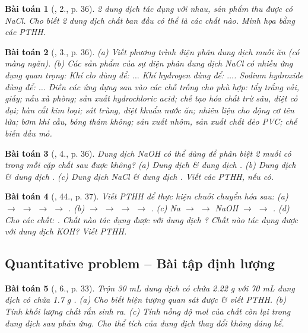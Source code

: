 \documentclass{article}
\newtheorem{baitoan}{Bài toán}
\begin{document}
\begin{baitoan}[\cite{SGK_Hoa_Hoc_9}, 2., p. 36]
	2 dung dịch tác dụng với nhau, sản phẩm thu được có \emph{NaCl}. Cho biết 2 dung dịch chất ban đầu có thể là các chất nào. Minh họa bằng các PTHH.
\end{baitoan}

\begin{baitoan}[\cite{SGK_Hoa_Hoc_9}, 3., p. 36]
	(a) Viết phương trình điện phân dung dịch muối ăn (có màng ngăn). (b) Các sản phẩm của sự điện phân dung dịch \emph{NaCl} có nhiều ứng dụng quan trọng: Khí clo dùng để: $\ldots$ Khí hydrogen dùng để: $\ldots$. Sodium hydroxide dùng để: $\ldots$ Điền các ứng dựng sau vào các chỗ trống cho phù hợp: tẩy trắng vải, giấy; nấu xà phòng; sản xuất hydrochloric acid; chế tạo hóa chất trừ sâu, diệt cỏ dại; hàn cắt kim loại; sát trùng, diệt khuẩn nước ăn; nhiên liệu cho động cơ tên lửa; bơm khí cầu, bóng thám không; sản xuất nhôm, sản xuất chất dẻo PVC; chế biến dầu mỏ.
\end{baitoan}

\begin{baitoan}[\cite{SGK_Hoa_Hoc_9}, 4., p. 36]
	Dung dịch \emph{NaOH} có thể dùng để phân biệt 2 muối có trong mỗi cặp chất sau được không? (a) Dung dịch \emph{} \& dung dịch \emph{}. (b) Dung dịch \emph{} \& dung dịch \emph{}. (c) Dung dịch \emph{NaCl} \& dung dịch \emph{}. Viết các PTHH, nếu có.
\end{baitoan}

\begin{baitoan}[\cite{An_350_BT_Hoa_Hoc_9}, 44., p. 37]
	Viết PTHH để thực hiện chuỗi chuyển hóa sau: (a) \emph{ $\to$  $\to$  $\to$  $\to$ }. (b) \emph{ $\to$  $\to$  $\to$  $\to$ }. (c) \emph{Na $\to$  $\to$ NaOH $\to$  $\to$ }. (d) Cho các chất: \emph{}. Chất nào tác dụng được với dung dịch \emph{}? Chất nào tác dụng được với dung dịch \emph{KOH}? Viết PTHH.
\end{baitoan}

\subsection{Quantitative problem -- Bài tập định lượng}

\begin{baitoan}[\cite{SGK_Hoa_Hoc_9}, 6., p. 33]
	Trộn \emph{30 mL} dung dịch có chứa \emph{2.22 g } với \emph{70 mL} dung dịch có chứa \emph{1.7 g }. (a) Cho biết hiện tượng quan sát được \& viết PTHH. (b) Tính khối lượng chất rắn sinh ra. (c) Tính nồng độ mol của chất còn lại trong dung dịch sau phản ứng. Cho thể tích của dung dịch thay đổi không đáng kể.
\end{baitoan}
\end{document}
